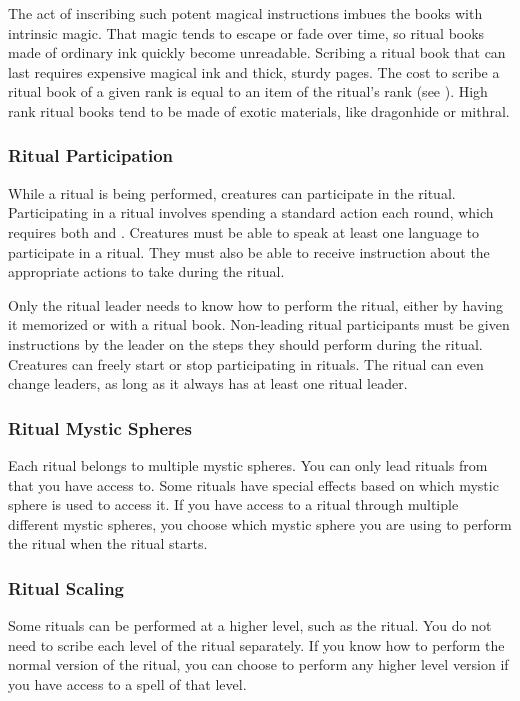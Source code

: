       The act of inscribing such potent magical instructions imbues the books with intrinsic magic.
      That magic tends to escape or fade over time, so ritual books made of ordinary ink quickly become unreadable.
      Scribing a ritual book that can last requires expensive magical ink and thick, sturdy pages.
      The cost to scribe a ritual book of a given rank is equal to an item of the ritual's rank (see ).
      High rank ritual books tend to be made of exotic materials, like dragonhide or mithral.

    \subsubsection{Ritual Participation}
      While a ritual is being performed, creatures can participate in the ritual.
      Participating in a ritual involves spending a standard action each round, which requires both  and .
      Creatures must be able to speak at least one language to participate in a ritual.
      They must also be able to receive instruction about the appropriate actions to take during the ritual.

      Only the ritual leader needs to know how to perform the ritual, either by having it memorized or with a ritual book.
      Non-leading ritual participants must be given instructions by the leader on the steps they should perform during the ritual.
      Creatures can freely start or stop participating in rituals.
      The ritual can even change leaders, as long as it always has at least one ritual leader.

    \subsubsection{Ritual Mystic Spheres}
      Each ritual belongs to multiple mystic spheres.
      You can only lead rituals from  that you have access to.
      Some rituals have special effects based on which mystic sphere is used to access it.
      If you have access to a ritual through multiple different mystic spheres, you choose which mystic sphere you are using to perform the ritual when the ritual starts.

    \subsubsection{Ritual Scaling}
      Some rituals can be performed at a higher level, such as the  ritual.
      You do not need to scribe each level of the ritual separately.
      If you know how to perform the normal version of the ritual, you can choose to perform any higher level version if you have access to a spell of that level.

